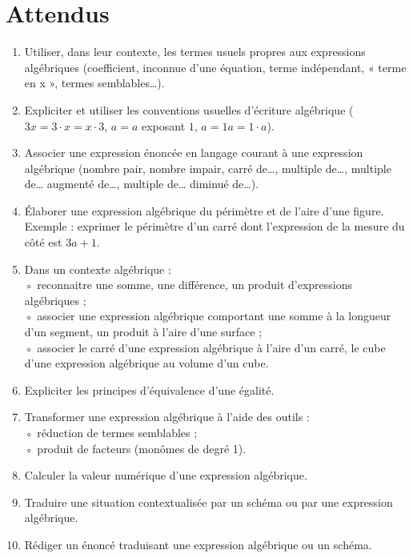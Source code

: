 \documentclass[../../syllabus_1.tex]{subfiles}
\begin{document}
\section*{Attendus}
\begin{enumerate}[label=\textbf{\arabic*.}]
    \item Utiliser, dans leur contexte, les termes usuels propres aux expressions algébriques (coefficient, inconnue d'une équation, terme indépendant, « terme en x », termes semblables…).
    \item Expliciter et utiliser les conventions usuelles d'écriture algébrique (\(3x = 3\cdot x = x \cdot 3\), $a = a$ exposant $1$, $a = 1a = 1 \cdot a $).
    \item Associer une expression énoncée en langage courant à une expression algébrique (nombre pair, nombre impair, carré de…, multiple de…, multiple de… augmenté de…, multiple de… diminué de…).
    \item Élaborer une expression algébrique du périmètre et de l'aire d'une figure. Exemple : exprimer le périmètre d'un carré dont l'expression de la mesure du côté est $3a+1$.
    \item Dans un contexte algébrique : \\
    ◦ reconnaitre une somme, une différence, un produit d'expressions algébriques ;\\
    ◦ associer une expression algébrique comportant une somme à la longueur d'un segment, un produit à l'aire d'une surface ;\\
    ◦ associer le carré d'une expression algébrique à l'aire d'un carré, le cube d'une expression algébrique au volume d'un cube.
    \item Expliciter les principes d'équivalence d'une égalité.
    \item Transformer une expression algébrique à l'aide des outils :\\
    ◦ réduction de termes semblables ;\\    
    ◦ produit de facteurs (monômes de degré 1).
    \item Calculer la valeur numérique d'une expression algébrique.
    \item Traduire une situation contextualisée par un schéma ou par une expression algébrique.
    \item Rédiger un énoncé traduisant une expression algébrique ou un schéma.
\end{enumerate}
\end{document}
